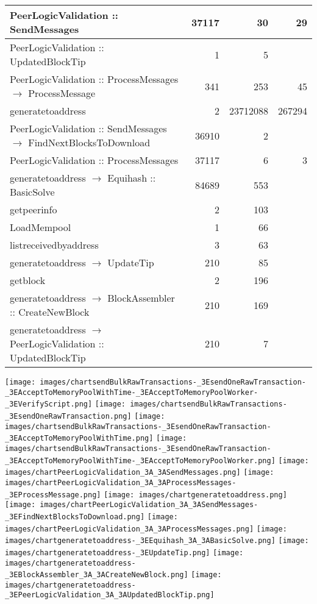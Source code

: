 \documentclass{article}
\begin{document}
\begin{tabular}{P{5cm}|r|r|r}
PeerLogicValidation :: SendMessages& 37117& 30&29\\\hline
PeerLogicValidation :: UpdatedBlockTip& 1& 5&\\\hline
PeerLogicValidation :: ProcessMessages $\to$ ProcessMessage& 341& 253&45\\\hline
generatetoaddress& 2& 23712088&267294\\\hline
PeerLogicValidation :: SendMessages $\to$ FindNextBlocksToDownload& 36910& 2&\\\hline
PeerLogicValidation :: ProcessMessages& 37117& 6&3\\\hline
generatetoaddress $\to$ Equihash :: BasicSolve& 84689& 553&\\\hline
getpeerinfo& 2& 103&\\\hline
LoadMempool& 1& 66&\\\hline
listreceivedbyaddress& 3& 63&\\\hline
generatetoaddress $\to$ UpdateTip& 210& 85&\\\hline
getblock& 2& 196&\\\hline
generatetoaddress $\to$ BlockAssembler :: CreateNewBlock& 210& 169&\\\hline
generatetoaddress $\to$ PeerLogicValidation :: UpdatedBlockTip& 210& 7&\\\hline
\end{tabular}

\texttt{[image: images/chartsendBulkRawTransactions-\_3EsendOneRawTransaction-\_3EAcceptToMemoryPoolWithTime-\_3EAcceptToMemoryPoolWorker-\_3EVerifyScript.png]}
\texttt{[image: images/chartsendBulkRawTransactions-\_3EsendOneRawTransaction.png]}
\texttt{[image: images/chartsendBulkRawTransactions-\_3EsendOneRawTransaction-\_3EAcceptToMemoryPoolWithTime.png]}
\texttt{[image: images/chartsendBulkRawTransactions-\_3EsendOneRawTransaction-\_3EAcceptToMemoryPoolWithTime-\_3EAcceptToMemoryPoolWorker.png]}
\texttt{[image: images/chartPeerLogicValidation\_3A\_3ASendMessages.png]}
\texttt{[image: images/chartPeerLogicValidation\_3A\_3AProcessMessages-\_3EProcessMessage.png]}
\texttt{[image: images/chartgeneratetoaddress.png]}
\texttt{[image: images/chartPeerLogicValidation\_3A\_3ASendMessages-\_3EFindNextBlocksToDownload.png]}
\texttt{[image: images/chartPeerLogicValidation\_3A\_3AProcessMessages.png]}
\texttt{[image: images/chartgeneratetoaddress-\_3EEquihash\_3A\_3ABasicSolve.png]}
\texttt{[image: images/chartgeneratetoaddress-\_3EUpdateTip.png]}
\texttt{[image: images/chartgeneratetoaddress-\_3EBlockAssembler\_3A\_3ACreateNewBlock.png]}
\texttt{[image: images/chartgeneratetoaddress-\_3EPeerLogicValidation\_3A\_3AUpdatedBlockTip.png]}
\end{document}
